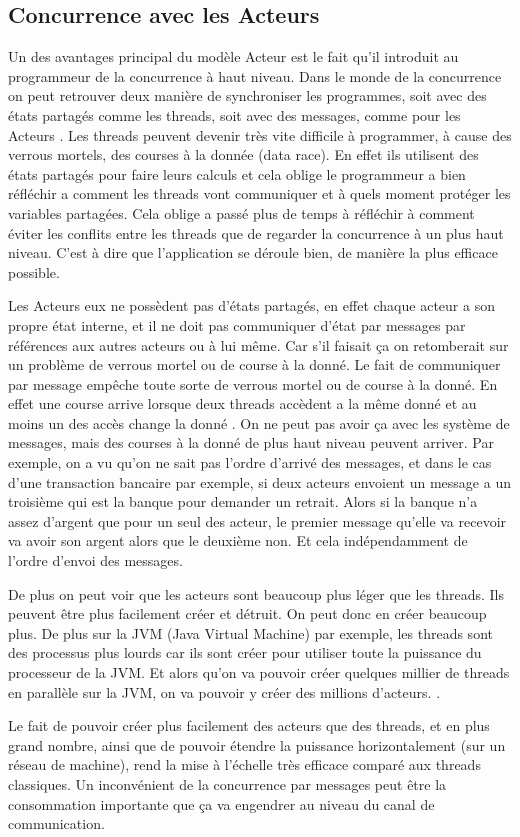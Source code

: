 \documentclass[11pt, a4paper]{article}
\begin{document}
\subsection{Concurrence avec les Acteurs}
Un des avantages principal du modèle Acteur est le fait qu'il introduit au programmeur de la concurrence à haut niveau. Dans le monde de la concurrence on peut retrouver deux manière de synchroniser les programmes, soit avec des états partagés comme les threads, soit avec des messages, comme pour les Acteurs \cite{haller2012actors}. Les threads peuvent devenir très vite difficile à programmer, à cause des verrous mortels, des courses à la donnée (data race). En effet ils utilisent des états partagés pour faire leurs calculs et cela oblige le programmeur a bien réfléchir a comment les threads vont communiquer et à quels moment protéger les variables partagées. Cela oblige a passé plus de temps à réfléchir à comment éviter les conflits entre les threads que de regarder la concurrence à un plus haut niveau. C'est à dire que l'application se déroule bien, de manière la plus efficace possible.

\par Les Acteurs eux ne possèdent pas d'états partagés, en effet chaque acteur a son propre état interne, et il ne doit pas communiquer d'état par messages par références aux autres acteurs ou à lui même. Car s'il faisait ça on retomberait sur un problème de verrous mortel ou de course à la donné. Le fait de communiquer par message empêche toute sorte de verrous mortel ou de course à la donné. En effet une course arrive lorsque deux threads accèdent a la même donné et au moins un des accès change la donné \cite{haller2012actors}. On ne peut pas avoir ça avec les système de messages, mais des courses à la donné de plus haut niveau peuvent arriver. Par exemple, on a vu qu'on ne sait pas l'ordre d'arrivé des messages, et dans le cas d'une transaction bancaire par exemple, si deux acteurs envoient un message a un troisième qui est la banque pour demander un retrait. Alors si la banque n'a assez d'argent que pour un seul des acteur, le premier message qu'elle va recevoir va avoir son argent alors que le deuxième non. Et cela indépendamment de l'ordre d'envoi des messages. 

\par De plus on peut voir que les acteurs sont beaucoup plus léger que les threads. Ils peuvent être plus facilement créer et détruit. On peut donc en créer beaucoup plus. De plus sur la JVM (Java Virtual Machine) par exemple, les threads sont des processus plus lourds car ils sont créer pour utiliser toute la puissance du processeur de la JVM. Et alors qu'on va pouvoir créer quelques millier de threads en parallèle sur la JVM, on va pouvoir y créer des millions d'acteurs. \cite{haller2012actors}.
\par Le fait de pouvoir créer plus facilement des acteurs que des threads, et en plus grand nombre, ainsi que de pouvoir étendre la puissance horizontalement (sur un réseau de machine), rend la mise à l'échelle très efficace comparé aux threads classiques. Un inconvénient de la concurrence par messages peut être la consommation importante que ça va engendrer au niveau du canal de communication.
\end{document}
